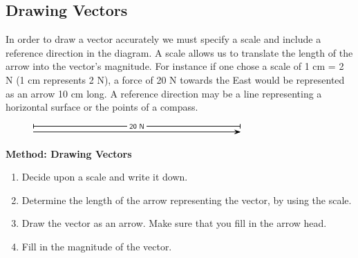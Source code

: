             \subsection{ Drawing Vectors}
            \nopagebreak
            
      
      \label{m38812*id187709}In order to draw a vector accurately we must specify a scale and
include a reference direction in the diagram. A scale allows us to
translate the length of the arrow into the vector's magnitude. For
instance if one chose a scale of 1 cm = 2 N (1 cm represents 2 N), a
force of 20 N towards the East would be represented as an arrow 10 cm
long. A reference direction may be a line representing a horizontal surface or the points of a compass.\par 
      \label{m38812*id187716}
        
    \setcounter{subfigure}{0}


	\begin{figure}[H] %
    \begin{center}
    \label{m38812*id187719!!!underscore!!!media}\label{m38812*id187719!!!underscore!!!printimage}\includegraphics[width=300px]{col11305.imgs/m38812_PG11C1_010.png} %
        
      \vspace{2pt}
    \vspace{.1in}
    
    \end{center}

 \end{figure}   

    \addtocounter{footnote}{-0}
    
      \par 
      \label{m38812*id187725}
        \textbf{Method: Drawing Vectors}
        \label{m38812*id187736}\begin{enumerate}[noitemsep, label=\textbf{\arabic*}. ] 
            \label{m38812*uid18}\item Decide upon a scale and write it down.
\label{m38812*uid19}\item Determine the length of the arrow representing the vector, by using the scale.
\label{m38812*uid20}\item Draw the vector as an arrow. Make sure that you fill in the arrow head.
\label{m38812*uid21}\item Fill in the magnitude of the vector.
\end{enumerate}
        
